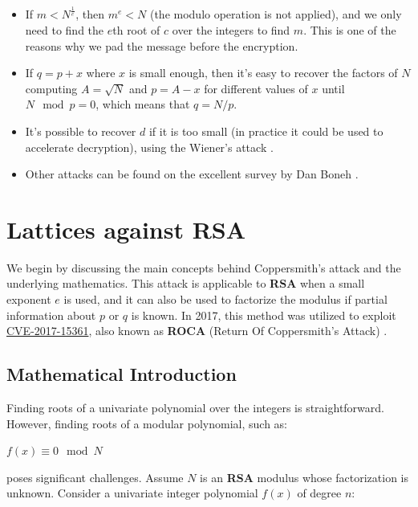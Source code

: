 \documentclass[a4paper,12pt]{report}
\begin{document}
\begin{itemize}
    \item If $m < N^{\frac{1}{e}}$, then $m^e < N$ (the modulo operation is not applied), and we only need to find the $e$th root of $c$ over the
        integers to find $m$. This is one of the reasons why we pad the message before the encryption.
    \item If $q = p + x$ where $x$ is small enough, then it's easy to recover the factors of $N$ computing $A = \sqrt{N}$ and 
            $p = A - x$ for different values of $x$ until $N \mod p = 0$, which means that $q = N / p$.
    \item It's possible to recover $d$ if it is too small (in practice it could be used to accelerate decryption), using the Wiener's attack \cite{wiener}.
    \item Other attacks can be found on the excellent survey by Dan Boneh \cite{boneh99twentyyears}.
\end{itemize}

\section{Lattices against RSA}

We begin by discussing the main concepts behind Coppersmith's attack \cite{coppersmith96} and the underlying mathematics. This attack is applicable to \textbf{RSA} when a small exponent $e$ is used, and it can also be used to factorize the modulus if partial information about $p$ or $q$ is known. In 2017, this method was utilized to exploit \href{https://cve.mitre.org/cgi-bin/cvename.cgi?name=CVE-2017-15361}{CVE-2017-15361}, also known as \textbf{ROCA} (Return Of Coppersmith's Attack) \cite{roca}.

\subsection{Mathematical Introduction}

Finding roots of a univariate polynomial over the integers is straightforward. However, finding roots of a modular polynomial, such as:

\begin{center}
    $f(x) \equiv 0 \mod N$
\end{center}

poses significant challenges. Assume $N$ is an \textbf{RSA} modulus whose factorization is unknown. Consider a univariate integer polynomial $f(x)$ of degree $n$:
\end{document}
